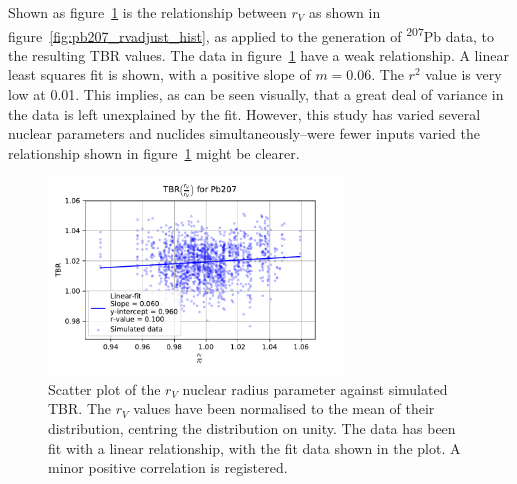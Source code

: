 Shown as figure~\ref{fig:pb207_rvadjust} is the relationship between $r_{V}$ as shown in figure~\ref{fig:pb207_rvadjust_hist}, as applied to the generation of \textsuperscript{207}Pb data, to the resulting TBR values. The data in figure~\ref{fig:pb207_rvadjust} have a weak relationship. A linear least squares fit is shown, with a positive slope of $m=0.06$. The $r^{2}$ value is very low at 0.01. This implies, as can be seen visually, that a great deal of variance in the data is left unexplained by the fit. However, this study has varied several nuclear parameters and nuclides simultaneously--were fewer inputs varied the relationship shown in figure~\ref{fig:pb207_rvadjust} might be clearer. 

\begin{figure}[H]
  \centering
	\includegraphics[width=0.7\textwidth]{Pb207_rvadjust}
	\caption{Scatter plot of the $r_{V}$ nuclear radius parameter against simulated TBR. The $r_{V}$ values have been normalised to the mean of their distribution, centring the distribution on unity. The data has been fit with a linear relationship, with the fit data shown in the plot. A minor positive correlation is registered.}
	\label{fig:pb207_rvadjust}
\end{figure}

